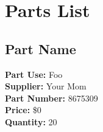 
\section{Parts List}
\label{sec:parts}

\subsection{Part Name}
\label{part:name_of_part}
\textbf{Part Use:} Foo \\ 
\textbf{Supplier:} Your Mom \\
\textbf{Part Number:} 8675309 \\
\textbf{Price:} \$0   \\ 
\textbf{Quantity:} 20  \\


